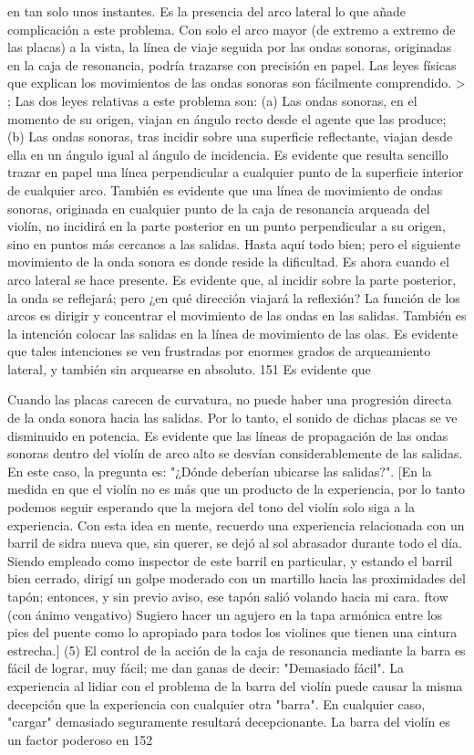 en tan solo unos instantes. Es la presencia del arco lateral lo que añade complicación a este problema. Con solo el arco mayor (de extremo a extremo de las placas) a la vista, la línea de viaje seguida por las ondas sonoras, originadas en la caja de resonancia, podría trazarse con precisión en papel. Las leyes físicas que explican los movimientos de las ondas sonoras son fácilmente
comprendido. > ;
Las dos leyes relativas a este problema son: (a) Las ondas sonoras, en el momento de su origen, viajan en ángulo recto desde el agente que las produce; (b) Las ondas sonoras, tras incidir sobre una superficie reflectante, viajan desde ella en un ángulo igual al ángulo de incidencia. Es evidente que resulta sencillo trazar en papel una línea perpendicular a cualquier punto de la superficie interior de cualquier arco. También es evidente que una línea de movimiento de ondas sonoras, originada en cualquier punto de la caja de resonancia arqueada del violín, no incidirá en la parte posterior en un punto perpendicular a su origen, sino en puntos más cercanos a las salidas. Hasta aquí todo bien; pero el siguiente movimiento de la onda sonora es donde reside la dificultad. Es ahora cuando el arco lateral se hace presente. Es evidente que, al incidir sobre la parte posterior, la onda se reflejará; pero ¿en qué dirección viajará la reflexión? La función de los arcos es dirigir y concentrar el movimiento de las ondas en las salidas. También es la intención colocar las salidas en la línea de movimiento de las olas. Es evidente que tales intenciones se ven frustradas por enormes grados de arqueamiento lateral,
y también sin arquearse en absoluto. 151	Es evidente que

Cuando las placas carecen de curvatura, no puede haber una progresión directa de la onda sonora hacia las salidas. Por lo tanto, el sonido de dichas placas se ve disminuido en potencia. Es evidente que las líneas de propagación de las ondas sonoras dentro del violín de arco alto se desvían considerablemente de las salidas. En este caso, la pregunta es: "¿Dónde deberían ubicarse las salidas?".
[En la medida en que el violín no es más que un producto de la experiencia, por lo tanto podemos seguir esperando que la mejora del tono del violín solo siga a la experiencia. Con esta idea en mente, recuerdo una experiencia relacionada con un barril de sidra nueva que, sin querer, se dejó al sol abrasador durante todo el día. Siendo empleado como inspector de este barril en particular, y estando el barril bien cerrado, dirigí un golpe moderado con un martillo hacia las proximidades del tapón; entonces, y sin previo aviso, ese tapón salió volando hacia mi cara.
ftow (con ánimo vengativo) Sugiero hacer un agujero en la tapa armónica entre los pies del puente como lo apropiado para todos los violines que tienen una cintura estrecha.]
(5) El control de la acción de la caja de resonancia mediante la barra es fácil de lograr, muy fácil; me dan ganas de decir: "Demasiado fácil". La experiencia al lidiar con el problema de la barra del violín puede causar la misma decepción que la experiencia con cualquier otra "barra". En cualquier caso, "cargar" demasiado seguramente resultará decepcionante. La barra del violín es un factor poderoso en
152

